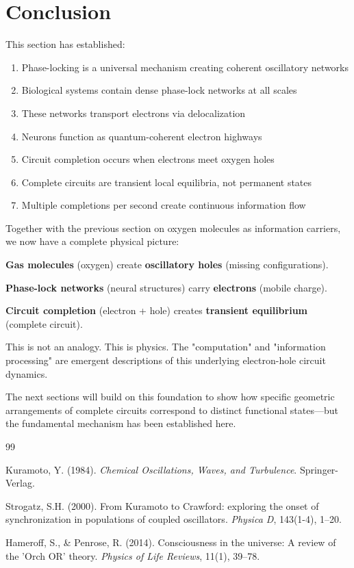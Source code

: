 \documentclass[11pt]{article}
\theoremstyle{remark}
\begin{document}
\section{Conclusion}

This section has established:
\begin{enumerate}
\item Phase-locking is a universal mechanism creating coherent oscillatory networks
\item Biological systems contain dense phase-lock networks at all scales
\item These networks transport electrons via delocalization
\item Neurons function as quantum-coherent electron highways
\item Circuit completion occurs when electrons meet oxygen holes
\item Complete circuits are transient local equilibria, not permanent states
\item Multiple completions per second create continuous information flow
\end{enumerate}

Together with the previous section on oxygen molecules as information carriers, we now have a complete physical picture:

\textbf{Gas molecules} (oxygen) create \textbf{oscillatory holes} (missing configurations).

\textbf{Phase-lock networks} (neural structures) carry \textbf{electrons} (mobile charge).

\textbf{Circuit completion} (electron + hole) creates \textbf{transient equilibrium} (complete circuit).

This is not an analogy. This is physics. The "computation" and "information processing" are emergent descriptions of this underlying electron-hole circuit dynamics.

The next sections will build on this foundation to show how specific geometric arrangements of complete circuits correspond to distinct functional states—but the fundamental mechanism has been established here.


\begin{thebibliography}{99}

Kuramoto, Y. (1984). \textit{Chemical Oscillations, Waves, and Turbulence}. Springer-Verlag.

Strogatz, S.H. (2000). From Kuramoto to Crawford: exploring the onset of synchronization in populations of coupled oscillators. \textit{Physica D}, 143(1-4), 1--20.

Hameroff, S., \& Penrose, R. (2014). Consciousness in the universe: A review of the 'Orch OR' theory. \textit{Physics of Life Reviews}, 11(1), 39--78.

\end{thebibliography}
\end{document}
